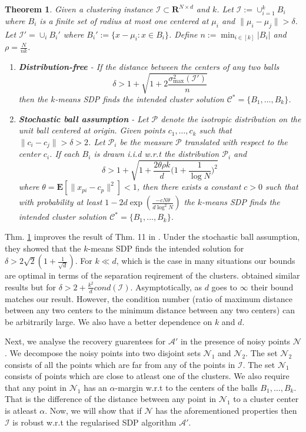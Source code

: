 \documentclass[12pt]{article}
\newcommand{\mc}{\mathcal}
\newcommand{\mb}{\mathbf}
\newtheorem{theorem}{Theorem}
\begin{document}
\begin{theorem}
\label{thm:SDPGeneral}
Given a clustering instance $\mc I \subset \mb R^{N\times d}$ and $k$. Let $\mc I := \cup_{i=1}^k B_i$ where $B_i$ is a finite set of radius at most one centered at $\mu_i$ and $\|\mu_i - \mu_j\| > \delta$. Let $\mc I' = \cup_i B_i'$ where $B_i' := \{x - \mu_i : x \in B_i\}$. Define $ n := \min_{i\in[k]} |B_i|$ and $\rho = \frac{N}{nk}$.
\begin{enumerate}[leftmargin=*,nolistsep,noitemsep]
	\item \textbf{Distribution-free} - If the distance between the centers of any two balls 
$$\delta > 1 + \sqrt{1+ 2\frac{\sigma_{\max}^2(\mc I')}{n}}$$ 
then the $k$-means SDP finds the intended cluster solution  $\mc C^* = \{B_1, \ldots, B_k\}$.
	\item \textbf{Stochastic ball assumption} - Let $\mc P$ denote the isotropic distribution on the unit ball centered at origin. Given points $c_1, \ldots, c_k$ such that $\|c_i - c_j\| > \delta  > 2$. Let $\mc P_i$ be the measure $\mc P$ translated with respect to the center $c_i$. If each $B_i$ is drawn i.i.d w.r.t the distribution $\mc P_i$ and 
$$\delta > 1 + \sqrt{1+\frac{2\theta\rho k}{d}\Big(1+\frac{1}{\log N}\Big)^2}$$  
where $\theta = \mb E[\|x_{pi}-c_p\|^2] < 1$, then there exists a constant $c > 0$ such that with probability at least $1 - 2d\exp(\frac{-cN\theta}{d\log^2N})$ the $k$-means SDP finds the intended cluster solution  $\mc C^* = \{B_1, \ldots, B_k\}$.
\end{enumerate}
\end{theorem}

Thm. \ref{thm:SDPGeneral} improves the result of Thm. 11 in \cite{awasthi2015relax}. Under the stochastic ball assumption, they showed that the $k$-means SDP finds the intended solution for $\delta > 2\sqrt{2}(1+\frac{1}{\sqrt{d}})$. For $k \ll d$, which is the case in many situations our bounds are optimal in terms of the separation reqirement of the clusters.  \cite{iguchi2015tightness} obtained similar results but for $\delta > 2 + \frac{k^2}{d}cond(\mc I)$. Asymptotically, as $d$ goes to $\infty$ their bound matches our result. However, the condition number (ratio of maximum distance between any two centers to the minimum distance between any two centers) can be arbitrarily large. We also have a better dependence on $k$ and $d$. 

Next, we analyse the recovery guarentees for $\mc A'$ in the presence of noisy points $\mc N$. We decompose the noisy points into two disjoint sets $\mc N_1$ and $\mc N_2$. The set $\mc N_2$ consists of all the points which are far from any of the points in $\mc I$. The set $\mc N_1$ consists of points which are close to atleast one of the clusters. We also require that any point in $\mc N_1$ has an $\alpha$-margin w.r.t to the centers of the balls $B_1, \ldots, B_k$. That is the difference of the distance between any point in $\mc N_1$ to a cluster center is atleast $\alpha$. Now, we will show that if $\mc N$ has the aforementioned properties then $\mc I$ is robust w.r.t the regularised SDP algorithm $\mc A'$.
\end{document}
